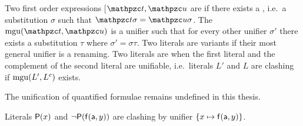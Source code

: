 
\begin{definition}\label{def:unifier}
Two first order expressions [\(\mct, \mcu\) are  if there exists a ,
i.e.~a substitution $\sigma$ such that $\mct\sigma=\mcu\sigma$.
The  $\mgu(\mct,\mcu)$ is a unifier such that
for every other unifier $\sigma'$ there exists a substitution $\tau$ where
$\sigma' = \sigma \tau$.
Two literals are variants if their most general unifier is a renaming.
Two literals are  when the first literal
and the complement of the second literal are unifiable,
i.e.~literals $L'$ and $L$ are clashing if $\operatorname{mgu}(L', L^c)$ exists.
\end{definition}

\begin{remark}
	The unification of quantified formulae remains undefined in this thesis.
\end{remark}

\begin{example}
	Literals $\mathsf{P}(x)$ and $\lnot\mathsf{P}(\mathsf{f}(\mathsf{a},y))$
	are clashing by unifier $\{ x\mapsto \mathsf{f}(\mathsf{a},y)\}$.
\end{example}
